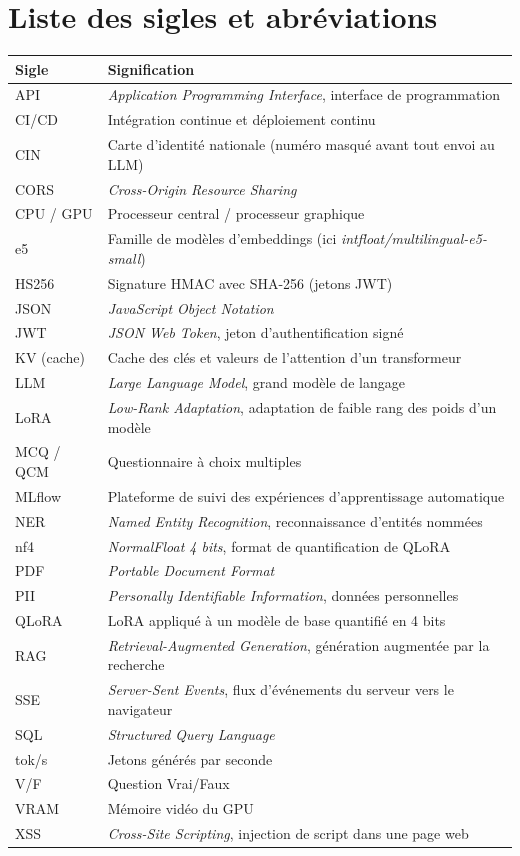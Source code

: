 \documentclass[12pt,a4paper]{report}
\begin{document}
\tableofcontents
\listoffigures
\listoftables

\chapter*{Liste des sigles et abréviations}

\begin{longtable}{@{}P{3.2cm}P{11.8cm}@{}}
\toprule
\textbf{Sigle} & \textbf{Signification} \\
\midrule
\endhead
API & \emph{Application Programming Interface}, interface de programmation \\
CI/CD & Intégration continue et déploiement continu \\
CIN & Carte d'identité nationale (numéro masqué avant tout envoi au LLM) \\
CORS & \emph{Cross-Origin Resource Sharing} \\
CPU / GPU & Processeur central / processeur graphique \\
e5 & Famille de modèles d'embeddings (ici \emph{intfloat/multilingual-e5-small}) \\
HS256 & Signature HMAC avec SHA-256 (jetons JWT) \\
JSON & \emph{JavaScript Object Notation} \\
JWT & \emph{JSON Web Token}, jeton d'authentification signé \\
KV (cache) & Cache des clés et valeurs de l'attention d'un transformeur \\
LLM & \emph{Large Language Model}, grand modèle de langage \\
LoRA & \emph{Low-Rank Adaptation}, adaptation de faible rang des poids d'un modèle \\
MCQ / QCM & Questionnaire à choix multiples \\
MLflow & Plateforme de suivi des expériences d'apprentissage automatique \\
NER & \emph{Named Entity Recognition}, reconnaissance d'entités nommées \\
nf4 & \emph{NormalFloat 4 bits}, format de quantification de QLoRA \\
PDF & \emph{Portable Document Format} \\
PII & \emph{Personally Identifiable Information}, données personnelles \\
QLoRA & LoRA appliqué à un modèle de base quantifié en 4 bits \\
RAG & \emph{Retrieval-Augmented Generation}, génération augmentée par la recherche \\
SSE & \emph{Server-Sent Events}, flux d'événements du serveur vers le navigateur \\
SQL & \emph{Structured Query Language} \\
tok/s & Jetons générés par seconde \\
V/F & Question Vrai/Faux \\
VRAM & Mémoire vidéo du GPU \\
XSS & \emph{Cross-Site Scripting}, injection de script dans une page web \\
\bottomrule
\end{longtable}
\end{document}
